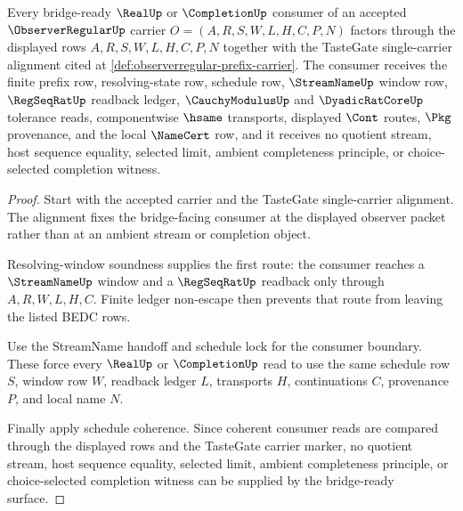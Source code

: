 \begin{theorem}
\label{thm:observerregular-bridged-consumer-surface}
Every bridge-ready $\RealUp$ or $\CompletionUp$ consumer of an accepted $\ObserverRegularUp$ carrier $O=(A,R,S,W,L,H,C,P,N)$ factors through the displayed rows $A,R,S,W,L,H,C,P,N$ together with the TasteGate single-carrier alignment cited at \autoref{def:observerregular-prefix-carrier}. The consumer receives the finite prefix row, resolving-state row, schedule row, $\StreamNameUp$ window row, $\RegSeqRatUp$ readback ledger, $\CauchyModulusUp$ and $\DyadicRatCoreUp$ tolerance reads, componentwise $\hsame$ transports, displayed $\Cont$ routes, $\Pkg$ provenance, and the local $\NameCert$ row, and it receives no quotient stream, host sequence equality, selected limit, ambient completeness principle, or choice-selected completion witness.
\end{theorem}
\begin{proof}
Start with the accepted carrier and the TasteGate single-carrier alignment. The alignment fixes the bridge-facing consumer at the displayed observer packet rather than at an ambient stream or completion object.

Resolving-window soundness supplies the first route: the consumer reaches a $\StreamNameUp$ window and a $\RegSeqRatUp$ readback only through $A,R,W,L,H,C$. Finite ledger non-escape then prevents that route from leaving the listed BEDC rows.

Use the StreamName handoff and schedule lock for the consumer boundary. These force every $\RealUp$ or $\CompletionUp$ read to use the same schedule row $S$, window row $W$, readback ledger $L$, transports $H$, continuations $C$, provenance $P$, and local name $N$.

Finally apply schedule coherence. Since coherent consumer reads are compared through the displayed rows and the TasteGate carrier marker, no quotient stream, host sequence equality, selected limit, ambient completeness principle, or choice-selected completion witness can be supplied by the bridge-ready surface.
\end{proof}

